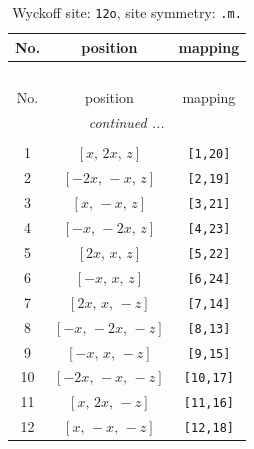 \documentclass[fleqn,8pt]{jsarticle}
\begin{document}
\begin{longtable}{ccc}
\caption{Wyckoff site: {\tt 12o}, site symmetry: {\tt .m.}}
 \\
 \hline \hline
No. & position & mapping \\ \hline \endfirsthead

\multicolumn{2}{l}{\tablename\ \thetable{}} \\
 \hline \hline
No. & position & mapping \\ \hline \endhead

 \hline \hline
\multicolumn{2}{r}{\footnotesize\it continued ...} \\ \endfoot

 \hline \hline
\multicolumn{2}{r}{} \\ \endlastfoot

1 & $\left[ x,\, 2 x,\, z \right]$ & {\tt [1,20]} \\ \hline
2 & $\left[ - 2 x,\, - x,\, z \right]$ & {\tt [2,19]} \\ \hline
3 & $\left[ x,\, - x,\, z \right]$ & {\tt [3,21]} \\ \hline
4 & $\left[ - x,\, - 2 x,\, z \right]$ & {\tt [4,23]} \\ \hline
5 & $\left[ 2 x,\, x,\, z \right]$ & {\tt [5,22]} \\ \hline
6 & $\left[ - x,\, x,\, z \right]$ & {\tt [6,24]} \\ \hline
7 & $\left[ 2 x,\, x,\, - z \right]$ & {\tt [7,14]} \\ \hline
8 & $\left[ - x,\, - 2 x,\, - z \right]$ & {\tt [8,13]} \\ \hline
9 & $\left[ - x,\, x,\, - z \right]$ & {\tt [9,15]} \\ \hline
10 & $\left[ - 2 x,\, - x,\, - z \right]$ & {\tt [10,17]} \\ \hline
11 & $\left[ x,\, 2 x,\, - z \right]$ & {\tt [11,16]} \\ \hline
12 & $\left[ x,\, - x,\, - z \right]$ & {\tt [12,18]} \\
\end{longtable}
\renewcommand{\arraystretch}{1.2}
\end{document}
